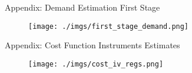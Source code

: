 \documentclass[notes,11pt, aspectratio=169]{beamer}
\begin{document}
\begin{frame}[label=firststage]{Appendix: Demand Estimation First Stage \hyperlink{demand}{}}
    \vspace{0.5cm}
      
        \begin{figure}[t*]
          \centering
    
          \texttt{[image: ./imgs/first\_stage\_demand.png]}
        \end{figure}
        
      \end{frame}

      \begin{frame}[label=costiv]{Appendix: Cost Function Instruments Estimates \hyperlink{cost}{}}
        \vspace{0.5cm}
          
            \begin{figure}[t*]
              \centering
        
              \texttt{[image: ./imgs/cost\_iv\_regs.png]}
            \end{figure}
            
          \end{frame}



\end{document}
